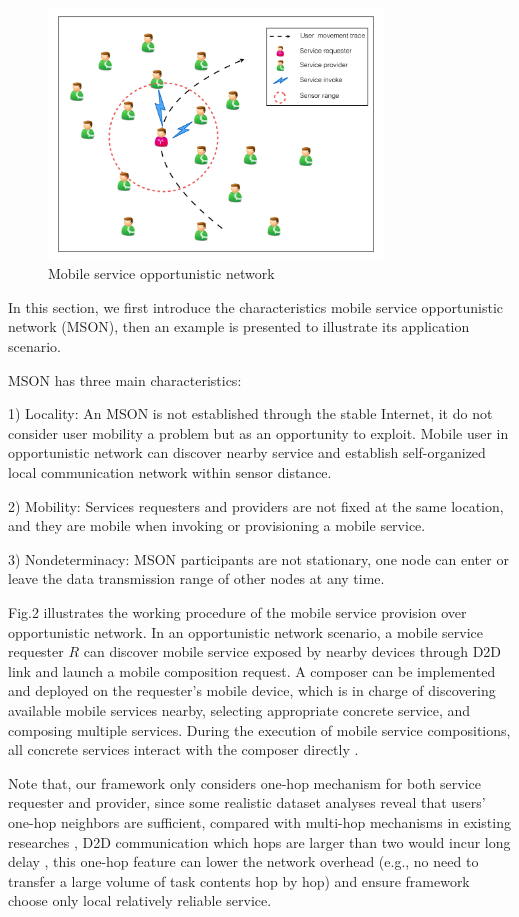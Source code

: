 \documentclass[10pt,journal,compsoc]{IEEEtran}
\begin{document}
\begin{figure}[!t]
\centering
\includegraphics[width=3.5in]{./img/pic2.pdf}
\caption{Mobile service opportunistic network}
\label{fig_mson}
\end{figure}

In this section, we first introduce the characteristics mobile service opportunistic network (MSON), then an example is presented to illustrate its application scenario.

MSON has three main characteristics:

1) Locality: An MSON is not established through the stable Internet, it do not consider user mobility a problem but as an opportunity to exploit. Mobile user in opportunistic network can discover nearby service and establish self-organized local communication network within sensor distance.

2) Mobility: Services requesters and providers are not fixed at the same location, and they are mobile when invoking or provisioning a mobile service.

3) Nondeterminacy: MSON participants are not stationary, one node can enter or leave the data transmission range of other nodes at any time. 

Fig.2 illustrates the working procedure of the mobile service provision over opportunistic network. In an opportunistic network scenario, a mobile service requester $R$ can discover mobile service exposed by nearby devices through D2D link and launch a mobile composition request. A composer can be implemented and deployed on the requester's mobile device, which is in charge of discovering available mobile services nearby, selecting appropriate concrete service, and composing multiple services. During the execution of mobile service compositions, all concrete services interact with the composer directly \cite{Deng2017}.

Note that, our framework only considers one-hop mechanism for both service requester and provider, since some realistic dataset analyses reveal that users' one-hop neighbors are sufficient, compared with multi-hop mechanisms in existing researches \cite{chang2015progressive,karaliopoulos2015user,han2016competition,tuncay2013participant,wu2013homing,jiang2016exploiting,liu2013exploring}, D2D communication which hops are larger than two would incur long delay \cite{li2014can},  this one-hop feature can lower the network overhead (e.g., no need to transfer a large volume of task contents hop by hop) and ensure framework choose only local relatively reliable service. 
\end{document}

